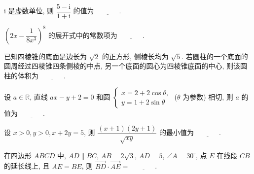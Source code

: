 \begin{question}
$\mathrm{i}$ 是虚数单位, 则 $\dfrac{5 - \mathrm{i}}{1 + \mathrm{i}}$ 的值为 $\underline{\phantom{XXXX}}$.

\end{question}
\begin{question}
$\left(2x - \dfrac{1}{8x^3}\right)^8$ 的展开式中的常数项为 $\underline{\phantom{XXXX}}$.

\end{question}
\begin{question}
已知四棱锥的底面是边长为 $\sqrt{2}$ 的正方形, 侧棱长均为 $\sqrt{5}$. 若圆柱的一个底面的圆周经过四棱锥四条侧棱的中点, 另一个底面的圆心为四棱锥底面的中心, 则该圆柱的体积为 $\underline{\phantom{XXXX}}$.

\end{question}
\begin{question}
设 $a \in \mathbb{R}$, 直线 $ax - y + 2 = 0$ 和圆 $\begin{cases} x = 2 + 2\cos\theta, \\ y = 1 + 2\sin\theta \end{cases}$ ($\theta$ 为参数) 相切, 则 $a$ 的值为 $\underline{\phantom{XXXX}}$.

\end{question}
\begin{question}
设 $x > 0, y > 0, x + 2y = 5$, 则 $\dfrac{(x + 1)(2y + 1)}{\sqrt{xy}}$ 的最小值为 $\underline{\phantom{XXXX}}$.

\end{question}
\begin{question}
在四边形 $ABCD$ 中, $AD \parallel BC$, $AB = 2\sqrt{3}$, $AD = 5$, $\angle A = 30^\circ$, 点 $E$ 在线段 $CB$ 的延长线上, 且 $AE = BE$, 则 $\vec{BD} \cdot \vec{AE} =$ $\underline{\phantom{XXXX}}$.

\par\medskip

\end{question}

